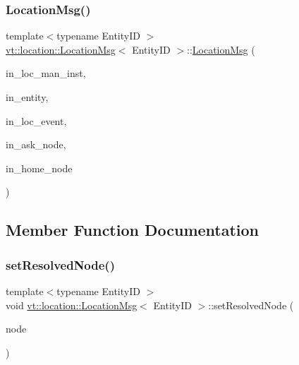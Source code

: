 \subsubsection{\texorpdfstring{Location\+Msg()}{LocationMsg()}}
{\footnotesize\ttfamily template$<$typename Entity\+ID $>$ \\
\hyperlink{structvt_1_1location_1_1_location_msg}{vt\+::location\+::\+Location\+Msg}$<$ Entity\+ID $>$\+::\hyperlink{structvt_1_1location_1_1_location_msg}{Location\+Msg} (\begin{DoxyParamCaption}\item[{\hyperlink{namespacevt_1_1location_a4db6456e8024af2d23fc5ae560fef866}{Loc\+Inst\+Type} const \&}]{in\+\_\+loc\+\_\+man\+\_\+inst,  }\item[{Entity\+ID const \&}]{in\+\_\+entity,  }\item[{\hyperlink{namespacevt_1_1location_aa5ccc1a42aa22b0b41fcfbbdee314dca}{Loc\+Event\+ID} const \&}]{in\+\_\+loc\+\_\+event,  }\item[{\hyperlink{namespacevt_a866da9d0efc19c0a1ce79e9e492f47e2}{Node\+Type} const \&}]{in\+\_\+ask\+\_\+node,  }\item[{\hyperlink{namespacevt_a866da9d0efc19c0a1ce79e9e492f47e2}{Node\+Type}}]{in\+\_\+home\+\_\+node }\end{DoxyParamCaption})\hspace{0.3cm}{\ttfamily [inline]}}



\subsection{Member Function Documentation}
\mbox{\label{structvt_1_1location_1_1_location_msg_a98f01158208640bb88e0d4583694f9bb}} 
\subsubsection{\texorpdfstring{set\+Resolved\+Node()}{setResolvedNode()}}
{\footnotesize\ttfamily template$<$typename Entity\+ID $>$ \\
void \hyperlink{structvt_1_1location_1_1_location_msg}{vt\+::location\+::\+Location\+Msg}$<$ Entity\+ID $>$\+::set\+Resolved\+Node (\begin{DoxyParamCaption}\item[{\hyperlink{namespacevt_a866da9d0efc19c0a1ce79e9e492f47e2}{Node\+Type} const \&}]{node }\end{DoxyParamCaption})\hspace{0.3cm}{\ttfamily [inline]}}



